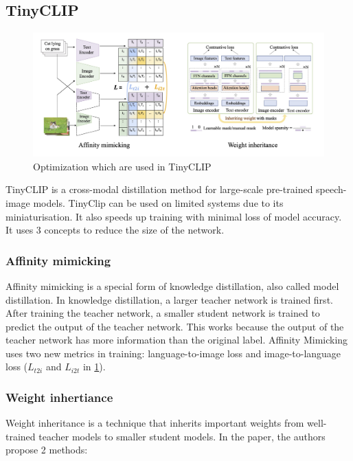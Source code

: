         \subsection{TinyCLIP
            \label{section:tinyclip}}
        \begin{figure}
            \centering
            \includegraphics[width=\textwidth]{Images/crossmodalnetworks/TinyCLIP.jpg}
            \caption{Optimization which are used in TinyCLIP\cite{tinyclip}}
            \label{fig:crossmodalnetworks:tinyclip}
        \end{figure}

        TinyCLIP\cite{tinyclip} is a cross-modal distillation method for large-scale pre-trained speech-image models.
TinyClip can be used on limited systems due to its miniaturisation.
        It also speeds up training with minimal loss of model accuracy.
        It uses 3 concepts to reduce the size of the network.

        \subsubsection{Affinity mimicking}
        Affinity mimicking is a special form of knowledge distillation, also called model distillation.
        In knowledge distillation, a larger teacher network is trained first.
        After training the teacher network, a smaller student network is trained to predict the output of the teacher network.
        This works because the output of the teacher network has more information than the original label.
        Affinity Mimicking uses two new metrics in training: language-to-image loss and image-to-language loss (\(L_{t2i}\) and \(L_{i2t}\) in \cref{fig:crossmodalnetworks:tinyclip}).

        \subsubsection{Weight inhertiance}
        Weight inheritance is a technique that inherits important weights from well-trained teacher models to smaller student models.
        In the paper, the authors propose 2 methods:

